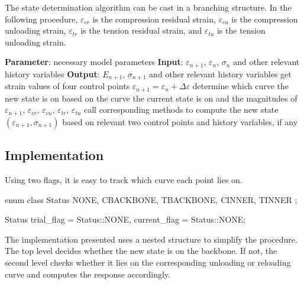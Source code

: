 The state determination algorithm can be cast in a branching structure.
In the following procedure, $\varepsilon_{cr}$ is the compression residual strain, $\varepsilon_{cu}$ is the compression unloading strain, $\varepsilon_{tr}$ is the tension residual strain, and $\varepsilon_{tu}$ is the tension unloading strain.
\begin{breakablealgorithm}
\caption{state determination of general hysteresis model}\label{algo:gen_hys}
\begin{algorithmic}[1]
\State \textbf{Parameter}: necessary model parameters
\State \textbf{Input}: $\varepsilon_{n+1}$, $\varepsilon_n$, $\sigma_n$ and other relevant history variables
\State \textbf{Output}: $E_{n+1}$, $\sigma_{n+1}$ and other relevant history variables
\State get strain values of four control points
\State $\varepsilon_{n+1}=\varepsilon_n+\Delta\varepsilon$
\State determine which curve the new state is on based on the curve the current state is on and the magnitudes of $\varepsilon_{n+1}$, $\varepsilon_{cr}$, $\varepsilon_{cu}$, $\varepsilon_{tr}$,  $\varepsilon_{tu}$
\State call corresponding methods to compute the new state $(\varepsilon_{n+1},\sigma_{n+1})$ based on relevant two control points and history variables, if any
\end{algorithmic}
\end{breakablealgorithm}

\subsection{Implementation}
Using two flags, it is easy to track which curve each point lies on.
\begin{cppcode}
	enum class Status { NONE, CBACKBONE, TBACKBONE, CINNER, TINNER };

	Status trial_flag = Status::NONE, current_flag = Status::NONE;
\end{cppcode}

The implementation presented uses a nested structure to simplify the procedure.
The top level decides whether the new state is on the backbone. If not, the second level checks whether it lies on the corresponding unloading or reloading curve and computes the response accordingly.

